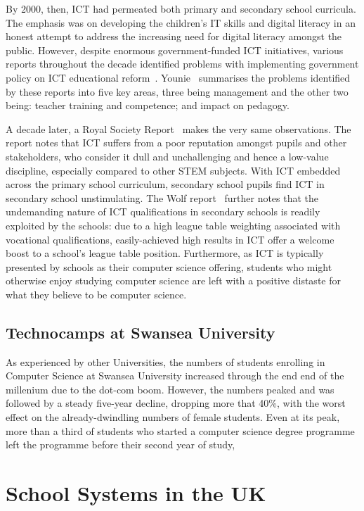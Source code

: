 \documentclass{sig-alternate}
\begin{document}
By 2000, then, ICT had permeated both
primary and secondary school curricula.
The emphasis was on developing the children's
IT skills and digital literacy in an honest
attempt to address the increasing need for
digital literacy amongst the public.
However, despite enormous government-funded ICT initiatives,
various reports throughout the decade identified problems
with implementing government policy on ICT educational
reform~\cite{OpieFukuyo:2000,Ofsted:2001,Ofsted:2002,Ofsted:2004,
Loveless:2005}.
Younie~\cite{Younie:2006} summarises the problems identified by
these reports into five key areas, three being management
and the other two being:
teacher training and competence; and impact on pedagogy.

A decade later, a Royal Society Report~\cite{RoyalSoc:2012}
makes the very same observations.
The report notes that ICT suffers from a poor reputation amongst pupils
and other stakeholders, who consider it dull and unchallenging and
hence a low-value discipline, especially compared to other STEM subjects.
With ICT embedded across the primary school curriculum,
secondary school pupils find ICT in secondary school unstimulating.
The Wolf report~\cite{Wolf:2011} further notes that
the undemanding nature of ICT qualifications in secondary schools
is readily exploited by the schools: due to a high league table
weighting associated with vocational qualifications, easily-achieved
high results in ICT offer a welcome boost to a school's league table position.
Furthermore, as ICT is typically presented by schools
as their computer science offering, students who might
otherwise enjoy studying computer science are left with
a positive distaste for what they believe to be computer science.

\subsection{Technocamps at Swansea University}
As experienced by other Universities,
the numbers of students enrolling in Computer Science
at Swansea University increased through the end end
of the millenium due to the dot-com boom.
However, the numbers peaked and was followed by
a steady five-year decline, dropping more that 40\%,
with the worst effect on the already-dwindling numbers
of female students.
Even at its peak, more than a third of students who
started a computer science degree programme left
the programme before their second year of study,


\section{School Systems in the UK}\label{sec:schools}
\end{document}
